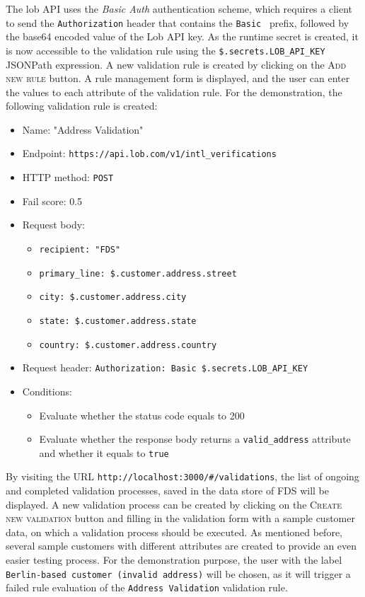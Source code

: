   The lob API uses the \emph{Basic Auth} authentication scheme, which requires a client to send the \verb;Authorization; header that contains the \verb;Basic ; prefix, followed by the base64 encoded value of the Lob API key. As the runtime secret is created, it is now accessible to the validation rule using the \verb;$.secrets.LOB_API_KEY; JSONPath expression. A new validation rule is created by clicking on the \textsc{Add new rule} button. A rule management form is displayed, and the user can enter the values to each attribute of the validation rule. For the demonstration, the following validation rule is created: 

  \begin{itemize}
   \item Name: "Address Validation"
   \item Endpoint: \verb;https://api.lob.com/v1/intl_verifications;
   \item HTTP method: \verb;POST;
   \item Fail score: 0.5
   \item Request body: 
     \begin{itemize}
       \item \verb;recipient: "FDS";
       \item \verb;primary_line: $.customer.address.street;
       \item \verb;city: $.customer.address.city;
       \item \verb;state: $.customer.address.state;
       \item \verb;country: $.customer.address.country;
     \end{itemize}
   \item Request header: \verb;Authorization: Basic $.secrets.LOB_API_KEY;
   \item Conditions:
     \begin{itemize}
      \item Evaluate whether the status code equals to 200
      \item Evaluate whether the response body returns a \verb;valid_address; attribute and whether it equals to \verb;true;
     \end{itemize}
  \end{itemize}
  
  By visiting the URL \verb;http://localhost:3000/#/validations;, the list of ongoing and completed validation processes, saved in the data store of FDS will be displayed. A new validation process can be created by clicking on the \textsc{Create new validation} button and filling in the validation form with a sample customer data, on which a validation process should be executed. As mentioned before, several sample customers with different attributes are created to provide an even easier testing process. For the demonstration purpose, the user with the label \verb;Berlin-based customer (invalid address); will be chosen, as it will trigger a failed rule evaluation of the \verb;Address Validation; validation rule. 

